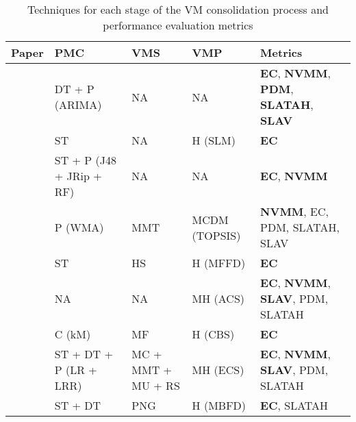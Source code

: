 
\newcommand{\tbf}[1]{\textbf{#1}}
\begin{table}[htb!]
	\tiny
	\caption{Techniques for each stage of the VM consolidation process and performance evaluation metrics}
	\begin{tabular}{@{}lllll@{}}
		\toprule
		Paper                           & PMC                       & VMS                                 & VMP                                 & Metrics                                 \\
		\midrule
		\cite{alsadie2018dtfa}          & DT + P (ARIMA)            & NA                                  & NA                                  & \tbf{EC}, \tbf{NVMM}, \tbf{PDM}, \tbf{SLATAH}, \tbf{SLAV}   \\
		\cite{alshathri2018sharing}     & ST                        & NA                                  & H (SLM)                             & \tbf{EC}                                        \\
		\cite{altomare2019data}         & ST + P (J48 + JRip + RF)  & NA                                  & NA                                  & \tbf{EC}, \tbf{NVMM}                            \\
		\cite{arianyan2018new}          & P (WMA)                   & MMT                                 & MCDM (TOPSIS)                       & \tbf{NVMM}, EC, PDM, SLATAH, SLAV               \\
		\cite{arif2018threshold}        & ST                        & HS                                  & H (MFFD)                            & \tbf{EC}                                        \\
		\cite{aryania2018energy}        & NA                        & NA                                  & MH (ACS)                            & \tbf{EC}, \tbf{NVMM}, \tbf{SLAV}, PDM, SLATAH   \\
		\cite{bajoria2018energy}        & C (kM)                    & MF                                  & H (CBS)                             & \tbf{EC}                                        \\
		\cite{barlaskar2018enhanced}    & ST + DT + P (LR + LRR)    & MC + MMT + MU + RS                  & MH (ECS)                            & \tbf{EC}, \tbf{NVMM}, \tbf{SLAV}, PDM, SLATAH   \\
		\cite{borhani2019power}         & ST + DT                   & PNG                                 & H (MBFD)                            & \tbf{EC}, SLATAH                                \\

\end{tabular}
\end{table}
